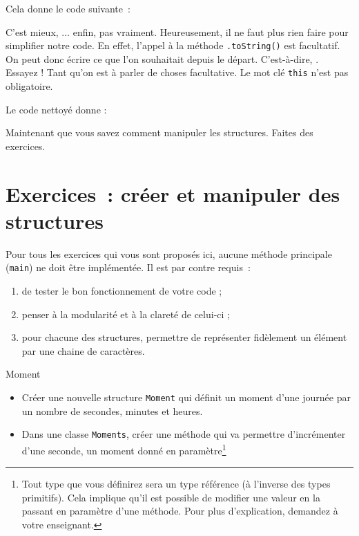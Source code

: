 \documentclass[a4paper,11pt]{article}
\begin{document}
	Cela donne le code suivante~:


	C'est mieux, ... enfin, pas vraiment. Heureusement, il ne faut plus rien faire pour simplifier notre code. En effet, l'appel à la méthode \texttt{.toString()} est facultatif. On peut donc écrire ce que l'on souhaitait depuis le départ. C'est-à-dire, . Essayez ! Tant qu'on est à parler de choses facultative. Le mot clé \texttt{this} n'est pas obligatoire.

	Le code nettoyé donne :

	Maintenant que vous savez comment manipuler les \og structures\fg. Faites des exercices.


	\bigskip

\section{Exercices~: créer et manipuler des structures}
	
	Pour tous les exercices qui vous sont proposés ici, aucune méthode principale (\texttt{main}) ne doit être implémentée. Il est par contre requis~:
	\begin{enumerate}
		\item de tester le bon fonctionnement de votre code ;
		\item penser à la modularité et à la clareté de celui-ci ;
		\item pour chacune des structures, permettre de représenter fidèlement un élément par une chaine de caractères.
	\end{enumerate}

	\begin{Exercice}{Moment}
		\begin{itemize}
			\item
				Créer une nouvelle structure \texttt{Moment} qui définit un moment d'une journée par un nombre de secondes, minutes et heures.
			\item 
				Dans une classe \texttt{Moments}, créer une méthode  qui va permettre d'incrémenter d'une seconde, un moment donné en paramètre\footnote{Tout type que vous définirez sera un type référence (à l'inverse des types primitifs). Cela implique qu'il est possible de modifier une valeur en la passant en paramètre d'une méthode. Pour plus d'explication, demandez à votre enseignant.}
		\end{itemize}		
	\end{Exercice}
\end{document}
